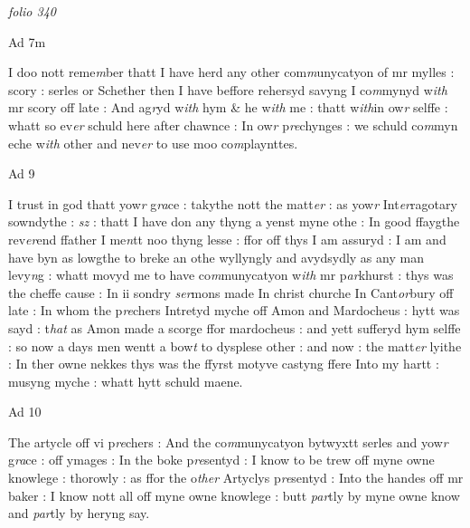 \documentclass[12pt, a4paper]{book}
\begin{document}
\dotfill
						\newpage
{}

\textit{folio 340}


 	
		\ifthenelse{\isodd{\thepage}}
		{\reversemarginpar}
		{\normalmarginpar}
		Ad 7m

 		
		\ifthenelse{\isodd{\thepage}}
		{\reversemarginpar}
		{\normalmarginpar}
		I doo nott reme\textit{m}ber thatt I have herd any other com\textit{m}unycatyon of mr
mylles : scory : serles or Schether then I have beffore rehersyd
savyng I co\textit{m}mynyd w\textit{ith} mr scory off late : And ag\textit{r}yd w\textit{ith} hym \&
he w\textit{ith} me : thatt w\textit{ith}in ow\textit{r} selffe : whatt so ev\textit{er} schuld here after
chawnce : In ow\textit{r} p\textit{re}chynges : we schuld co\textit{m}myn eche w\textit{ith} other
and nev\textit{er} to use moo co\textit{m}playnttes.

 	
		\ifthenelse{\isodd{\thepage}}
		{\reversemarginpar}
		{\normalmarginpar}
		Ad 9

 		
		\ifthenelse{\isodd{\thepage}}
		{\reversemarginpar}
		{\normalmarginpar}
		I trust in god thatt yow\textit{r} g\textit{ra}ce : takythe nott the matt\textit{er} : as yow\textit{r}
Int\textit{er}ragotary sowndythe : \textit{sz} : thatt I have don any thyng a yenst
myne othe : In good ffaygthe rev\textit{er}end ffather I me\textit{n}tt noo thyng
lesse : ffor off thys I am assuryd : I am and have byn
as lowgthe to breke an othe wyllyngly and avydsydly as
any man levy\textit{n}g : whatt movyd me to have co\textit{m}munycatyon w\textit{ith} mr
p\textit{ar}khurst : thys was the cheffe cause : In ii sondry \textit{ser}mons made 
In christ churche In Cant\textit{or}bury off late : In whom the p\textit{re}chers
Intretyd myche off Amon and Mardocheus : hytt was sayd : t\textit{hat} 
as Amon made a scorge ffor mardocheus : and yett sufferyd 
hym selffe : so now a days men wentt a bow\textit{t} to dysplese 
other : and now : the matt\textit{er} lyithe : In ther owne nekkes
thys was the ffyrst motyve castyng ffere Into my hartt : musyng
myche : whatt hytt schuld maene.
 	
 	
		\ifthenelse{\isodd{\thepage}}
		{\reversemarginpar}
		{\normalmarginpar}
		Ad 10

 		
		\ifthenelse{\isodd{\thepage}}
		{\reversemarginpar}
		{\normalmarginpar}
		The artycle off vi p\textit{re}chers : And the co\textit{m}munycatyon bytwyxtt serles
and yow\textit{r} g\textit{ra}ce : off ymages : In the boke p\textit{re}sentyd : I know to 
be trew off myne owne knowlege : thorowly : as ffor the o\textit{ther}
Artyclys p\textit{re}sentyd : Into the handes off mr baker : I know nott
all off myne owne knowlege : butt \textit{par}tly by myne owne know
and \textit{par}tly by heryng say.
\end{document}

